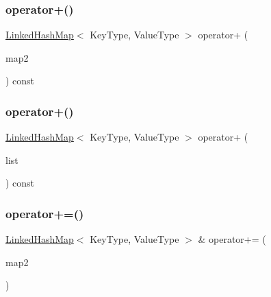 \mbox{\label{classLinkedHashMap_a6a85e7e170200435c3beb2e930ca64b2}} 
\subsubsection{\texorpdfstring{operator+()}{operator+()}\hspace{0.1cm}{\footnotesize\ttfamily [1/2]}}
{\footnotesize\ttfamily \mbox{\hyperlink{classLinkedHashMap}{Linked\+Hash\+Map}}$<$ Key\+Type, Value\+Type $>$ operator+ (\begin{DoxyParamCaption}\item[{const \mbox{\hyperlink{classLinkedHashMap}{Linked\+Hash\+Map}}$<$ Key\+Type, Value\+Type $>$ \&}]{map2 }\end{DoxyParamCaption}) const}

\mbox{\label{classLinkedHashMap_af9702bd0fcc2d2320899006cd659f934}} 
\subsubsection{\texorpdfstring{operator+()}{operator+()}\hspace{0.1cm}{\footnotesize\ttfamily [2/2]}}
{\footnotesize\ttfamily \mbox{\hyperlink{classLinkedHashMap}{Linked\+Hash\+Map}}$<$ Key\+Type, Value\+Type $>$ operator+ (\begin{DoxyParamCaption}\item[{std\+::initializer\+\_\+list$<$ std\+::pair$<$ Key\+Type, Value\+Type $>$ $>$}]{list }\end{DoxyParamCaption}) const}

\mbox{\label{classLinkedHashMap_a41cb6fea75c4d49ba2c9d3880980a520}} 
\subsubsection{\texorpdfstring{operator+=()}{operator+=()}\hspace{0.1cm}{\footnotesize\ttfamily [1/2]}}
{\footnotesize\ttfamily \mbox{\hyperlink{classLinkedHashMap}{Linked\+Hash\+Map}}$<$ Key\+Type, Value\+Type $>$ \& operator+= (\begin{DoxyParamCaption}\item[{const \mbox{\hyperlink{classLinkedHashMap}{Linked\+Hash\+Map}}$<$ Key\+Type, Value\+Type $>$ \&}]{map2 }\end{DoxyParamCaption})}

